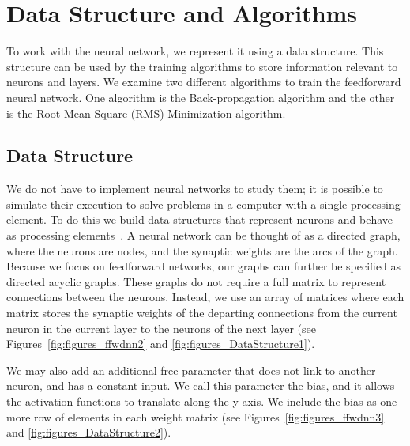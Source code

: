 \documentclass[11pt]{article}
\begin{document}


\section{Data Structure and Algorithms} %
\label{sec:data_structure_and_algorithms}

To work with the neural network, we represent it using a data structure. This structure can be used by the training algorithms to store
information relevant to neurons and layers. We examine two different algorithms to train the feedforward neural network. One algorithm
is the Back-propagation algorithm and the other is the Root Mean Square (RMS) Minimization algorithm.

\subsection{Data Structure} %
\label{sub:data_structure}

We do not have to implement neural networks to study them; it is possible to simulate their execution to solve problems in a computer
with a single processing element. To do this we build data structures that represent neurons and behave as processing
elements~\cite{skapura}. A neural network can be thought of as a directed graph, where the neurons are nodes, and the synaptic weights
are the arcs of the graph. Because we focus on feedforward networks, our graphs can further be specified as directed acyclic graphs.
These graphs do not require a full matrix to represent connections between the neurons. Instead, we use an array of matrices where each
matrix stores the synaptic weights of the departing connections from the current neuron in the current layer to the neurons of the next
layer (see Figures~\ref{fig:figures_ffwdnn2} and \ref{fig:figures_DataStructure1}).

We may also add an additional free parameter that does not link to another neuron, and has a constant input. We call this parameter the
bias, and it allows the activation functions to translate along the y-axis. We include the bias as one more row of elements in each
weight matrix (see Figures~\ref{fig:figures_ffwdnn3} and \ref{fig:figures_DataStructure2}).
\end{document}

